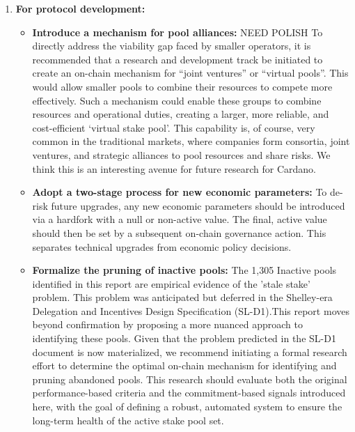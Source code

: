 \documentclass[11pt, letterpaper]{article}
\begin{document}
\begin{enumerate}
	\item \textbf{For protocol development:}
	      \begin{itemize}
		      \item \textbf{Introduce a mechanism for pool alliances:} NEED POLISH To directly address the viability gap faced by
		            smaller operators, it is recommended that a research and development track be initiated to create an
		            on-chain mechanism for ``joint ventures'' or ``virtual pools''. This would allow smaller pools to combine
		            their resources to compete more effectively. Such a mechanism could enable these groups to combine resources
		            and operational duties, creating a larger, more reliable, and cost-efficient
		            `virtual stake pool'. This capability is, of course, very common in the traditional markets, where companies
		            form consortia, joint ventures, and strategic alliances to pool resources and share risks. We think this is an interesting avenue for
		            future research for Cardano.
		      \item \textbf{Adopt a two-stage process for new economic parameters:} To de-risk future upgrades, any
		            new economic parameters should be introduced via a hardfork with a null or non-active value. The final,
		            active value should then be set by a subsequent on-chain governance action. This separates technical
		            upgrades from economic policy decisions.
		      \item \textbf{Formalize the pruning of inactive pools:}  The 1,305 Inactive pools identified in this report are empirical
		            evidence of the 'stale stake' problem. This problem was anticipated but deferred in the Shelley-era
		            Delegation and Incentives Design Specification (SL-D1).This report moves beyond confirmation by proposing a more nuanced approach to
		            identifying these pools. Given that the problem predicted in the SL-D1 document is now materialized, we
		            recommend initiating a formal research effort to determine the optimal on-chain mechanism for identifying and
		            pruning abandoned pools. This research should evaluate both the original performance-based criteria and the
		            commitment-based signals introduced here, with the goal of defining a robust, automated system to ensure the
		            long-term health of the active stake pool set.
	      \end{itemize}


\end{enumerate}
\end{document}

